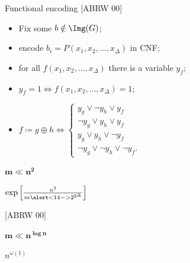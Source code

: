 \begin{frame}{Functional encoding [ABRW 00]}
    
    \pause
    \begin{minipage}{0.38\linewidth}
        \centering
        
    \end{minipage}
    \begin{minipage}{0.58\linewidth}
        \begin{itemize}
            \item Fix some $b \notin \Img(G)$;
                \pause
            \item encode $b_i = P(x_1, x_2, \dots, x_{\Delta})$ in CNF;
                \pause
            \item for all $f(x_1, x_2, \dots, x_{\Delta})$ there is a variable $y_f$;
            \item $y_f = 1 \Leftrightarrow f(x_1, x_2, \dots, x_{\Delta}) = 1$;
                \pause
            \item $f \coloneqq g \oplus h \Leftrightarrow
                \begin{cases}
                    y_g \lor \neg y_h \lor y_f \\
                    \neg y_g \lor y_h \lor y_f \\
                    y_g \lor y_h \lor \neg y_f \\
                    \neg y_g \lor \neg y_h \lor \neg y_f.
                \end{cases}$
        \end{itemize}
    \end{minipage}

    \pause
    \vspace{0.2cm}
    \begin{minipage}[t][3cm][t]{0.32\linewidth}
        \centering
        $\mathbf{m \ll n^2}$

        \pause
        \vspace{0.2cm}
        $\exp\left[\frac{n^2}{m \alert<14->{2^{2^{\Delta}}}} \right]$

        \vspace{0.2cm}
        [ABRW 00]
    \end{minipage}
    \pause
    \begin{minipage}[t][3cm][t]{0.32\linewidth}
        \centering
        $\mathbf{m \ll n^{\log n}}$

        \pause
        \vspace{0.2cm}
        $n^{\omega(1)}$


\end{minipage}
\end{frame}
